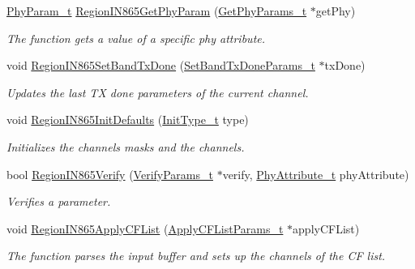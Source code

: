 \begin{DoxyCompactItemize}
\item 
\hyperlink{group__REGION_gaed159b26e5c4677236b6e8677019db30}{Phy\+Param\+\_\+t} \hyperlink{group__REGIONIN865_ga209a89a7195dbbee8428bbcd0133d986}{Region\+I\+N865\+Get\+Phy\+Param} (\hyperlink{group__REGION_gab471483fff904f4f89bbc03f7fc380ab}{Get\+Phy\+Params\+\_\+t} $\ast$get\+Phy)
\begin{DoxyCompactList}\small\item\em The function gets a value of a specific phy attribute. \end{DoxyCompactList}\item 
void \hyperlink{group__REGIONIN865_ga328c341535bded76103e52c4e4c685fe}{Region\+I\+N865\+Set\+Band\+Tx\+Done} (\hyperlink{group__REGION_gad0524aa0673c0814a71e7a4f9cade3fc}{Set\+Band\+Tx\+Done\+Params\+\_\+t} $\ast$tx\+Done)
\begin{DoxyCompactList}\small\item\em Updates the last TX done parameters of the current channel. \end{DoxyCompactList}\item 
void \hyperlink{group__REGIONIN865_ga06d37a72380911c81768c31a4f0b6da7}{Region\+I\+N865\+Init\+Defaults} (\hyperlink{group__REGION_gaddc73ae10673ec925724e7870363bda9}{Init\+Type\+\_\+t} type)
\begin{DoxyCompactList}\small\item\em Initializes the channels masks and the channels. \end{DoxyCompactList}\item 
bool \hyperlink{group__REGIONIN865_ga1cc642ea1ceb59071532c10f0307981d}{Region\+I\+N865\+Verify} (\hyperlink{group__REGION_ga966d97bc2f25df1c09e92e60ef652276}{Verify\+Params\+\_\+t} $\ast$verify, \hyperlink{group__REGION_ga9445b07fdf77581ecfaf389970e635f8}{Phy\+Attribute\+\_\+t} phy\+Attribute)
\begin{DoxyCompactList}\small\item\em Verifies a parameter. \end{DoxyCompactList}\item 
void \hyperlink{group__REGIONIN865_ga4b896d2b7f6cd70d1c11b9f38ee06acf}{Region\+I\+N865\+Apply\+C\+F\+List} (\hyperlink{group__REGION_ga71588e9ad07e34b78fa91d51881fd3c6}{Apply\+C\+F\+List\+Params\+\_\+t} $\ast$apply\+C\+F\+List)
\begin{DoxyCompactList}\small\item\em The function parses the input buffer and sets up the channels of the CF list. \end{DoxyCompactList}\item 

\end{DoxyCompactItemize}
